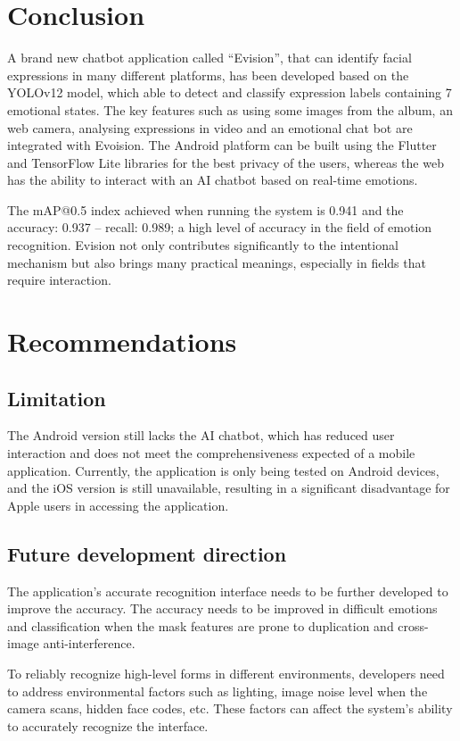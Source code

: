 \documentclass[a4paper,13pt]{report}
\begin{document}
\section{Conclusion}
A brand new chatbot application called “Evision”, that can identify facial expressions in many different platforms, has been developed based on the YOLOv12 model, which able to detect and classify expression labels containing 7 emotional states. The key features such as using some images from the album, an web camera, analysing expressions in video and an emotional chat bot are integrated with Evoision. The Android platform can be built using the Flutter and TensorFlow Lite libraries for the best privacy of the users, whereas the web has the ability to interact with an AI chatbot based on real-time emotions.

The mAP@0.5 index achieved when running the system is 0.941 and the accuracy: 0.937 – recall: 0.989; a high level of accuracy in the field of emotion recognition. Evision not only contributes significantly to the intentional mechanism but also brings many practical meanings, especially in fields that require interaction.

\section{Recommendations}
\subsection{Limitation}
The Android version still lacks the AI chatbot, which has reduced user interaction and does not meet the comprehensiveness expected of a mobile application. Currently, the application is only being tested on Android devices, and the iOS version is still unavailable, resulting in a significant disadvantage for Apple users in accessing the application.

\subsection{Future development direction}
The application's accurate recognition interface needs to be further developed to improve the accuracy. The accuracy needs to be improved in difficult emotions and classification when the mask features are prone to duplication and cross-image anti-interference.

To reliably recognize high-level forms in different environments, developers need to address environmental factors such as lighting, image noise level when the camera scans, hidden face codes, etc. These factors can affect the system's ability to accurately recognize the interface.
\end{document}
